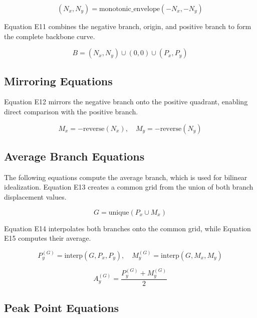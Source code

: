 \documentclass[11pt,a4paper]{article}
\begin{document}
\begin{equation}
(N_x, N_y) = \text{monotonic\_envelope}(-N_x, -N_y)
\tag{E10}
\label{eq:E10}
\end{equation}

Equation E11 combines the negative branch, origin, and positive branch to form the complete backbone curve.

\begin{equation}
B = (N_x, N_y) \cup (0, 0) \cup (P_x, P_y)
\tag{E11}
\label{eq:E11}
\end{equation}

\subsection{Mirroring Equations}

Equation E12 mirrors the negative branch onto the positive quadrant, enabling direct comparison with the positive branch.

\begin{equation}
M_x = -\text{reverse}(N_x), \quad M_y = -\text{reverse}(N_y)
\tag{E12}
\label{eq:E12}
\end{equation}

\subsection{Average Branch Equations}

The following equations compute the average branch, which is used for bilinear idealization. Equation E13 creates a common grid from the union of both branch displacement values.

\begin{equation}
G = \text{unique}(P_x \cup M_x)
\tag{E13}
\label{eq:E13}
\end{equation}

Equation E14 interpolates both branches onto the common grid, while Equation E15 computes their average.

\begin{equation}
P_y^{(G)} = \text{interp}(G, P_x, P_y), \quad M_y^{(G)} = \text{interp}(G, M_x, M_y)
\tag{E14}
\label{eq:E14}
\end{equation}

\begin{equation}
A_y^{(G)} = \frac{P_y^{(G)} + M_y^{(G)}}{2}
\tag{E15}
\label{eq:E15}
\end{equation}

\subsection{Peak Point Equations}
\end{document}
